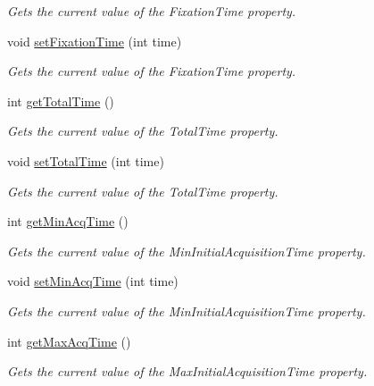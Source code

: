 \begin{DoxyCompactItemize}
\begin{DoxyCompactList}\small\item\em Gets the current value of the Fixation\-Time property. \end{DoxyCompactList}\item 
void \hyperlink{class_picto_1_1_target_controller_a7099fe860b5afde2516679e0f844faf6}{set\-Fixation\-Time} (int time)
\begin{DoxyCompactList}\small\item\em Gets the current value of the Fixation\-Time property. \end{DoxyCompactList}\item 
int \hyperlink{class_picto_1_1_target_controller_a2589b642a506dda1e97e121d14f29007}{get\-Total\-Time} ()
\begin{DoxyCompactList}\small\item\em Gets the current value of the Total\-Time property. \end{DoxyCompactList}\item 
void \hyperlink{class_picto_1_1_target_controller_a0e375eeabc77feb79c348a1fa92547fe}{set\-Total\-Time} (int time)
\begin{DoxyCompactList}\small\item\em Gets the current value of the Total\-Time property. \end{DoxyCompactList}\item 
int \hyperlink{class_picto_1_1_target_controller_a95bdf78c56f91f43631d107cd7598c18}{get\-Min\-Acq\-Time} ()
\begin{DoxyCompactList}\small\item\em Gets the current value of the Min\-Initial\-Acquisition\-Time property. \end{DoxyCompactList}\item 
void \hyperlink{class_picto_1_1_target_controller_a3d4259a7dea51b762e56c64eb234ddef}{set\-Min\-Acq\-Time} (int time)
\begin{DoxyCompactList}\small\item\em Gets the current value of the Min\-Initial\-Acquisition\-Time property. \end{DoxyCompactList}\item 
int \hyperlink{class_picto_1_1_target_controller_ab0e0be1b63ea46e86bb4b56ffd5373d5}{get\-Max\-Acq\-Time} ()
\begin{DoxyCompactList}\small\item\em Gets the current value of the Max\-Initial\-Acquisition\-Time property. \end{DoxyCompactList}\item 

\end{DoxyCompactItemize}
